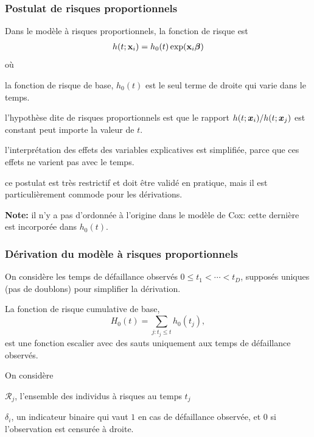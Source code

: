 \documentclass{beamer}
\begin{document}
\begin{frame}
\frametitle{Postulat de risques proportionnels}
Dans le modèle à risques proportionnels, la fonction de risque est
\begin{align*}
 h(t; \mathbf{x}_i) = h_0(t)\exp(\mathbf{x}_i\boldsymbol {\beta})
\end{align*}
où
\bi \item la fonction de risque de base, $h_0(t)$ est le seul terme de droite qui varie dans le temps.
\item l'hypothèse dite de \alert{risques proportionnels} est que le rapport $h(t; \boldsymbol {x}_i)/h(t; \boldsymbol {x}_j)$ est constant peut importe la valeur de $t$.
\item l'interprétation des effets des variables explicatives est simplifiée, parce que ces effets ne varient pas avec le temps.
\item ce postulat est très restrictif et doit être validé en pratique, mais il est particulièrement commode pour les dérivations.
\ei

\textbf{Note:} il n'y a pas d'ordonnée à l'origine dans le modèle de Cox: cette dernière est incorporée dans $h_0(t)$.
\end{frame}
\begin{frame}
 \frametitle{Dérivation du modèle à risques proportionnels}
 
On considère les temps de défaillance observés $0 \leq t_1 < \cdots < t_D$, supposés uniques (pas de doublons) pour simplifier la dérivation.


La fonction de risque cumulative de base,
\[
H_0(t) = \sum_{j: t_j \leq t} h_0(t_j),
\] est une fonction escalier avec des sauts uniquement aux temps de défaillance observés.

On considère 
\bi 
\item $\mathcal{R}_j$, l'ensemble des individus à risques au temps $t_j$
\item $\delta_i$, un indicateur binaire qui vaut $1$ en cas de défaillance observée, et $0$ si l'observation est censurée à droite.
\ei

\end{frame}
\end{document}
